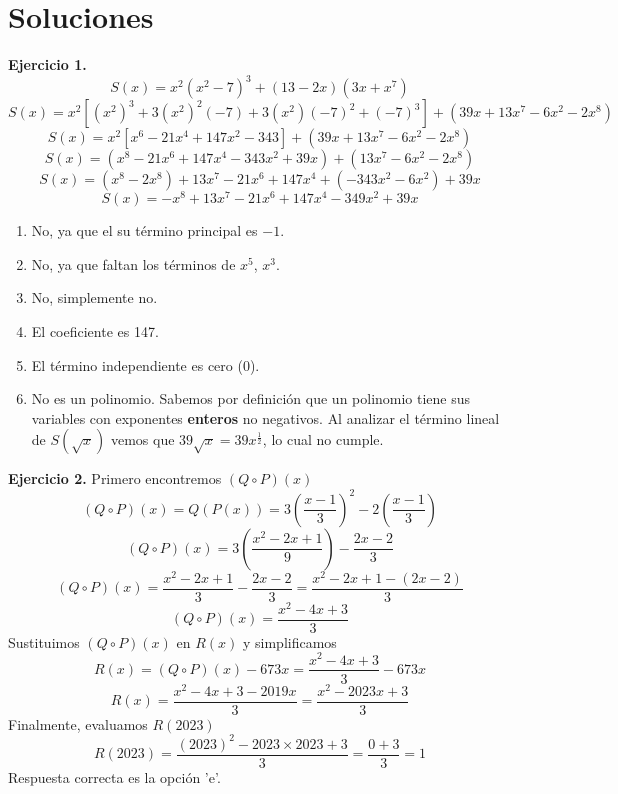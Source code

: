 \newpage

\section*{\large Soluciones}
{
    \textbf{Ejercicio 1.}
    \[S(x) = x^2(x^2 - 7)^3 + (13 - 2x)(3x + x^7)\]
    \[S(x) = x^2 \left[ (x^2)^3 + 3 (x^2)^2(-7) + 3 (x^2)(-7)^2 + (-7)^3 \right] + (39x + 13x^7 - 6x^2 - 2x^8)\]
    \[S(x) = x^2 \left[ x^6 - 21x^4 + 147 x^2 - 343 \right] + (39x + 13x^7 - 6x^2 - 2x^8)\]
    \[S(x) = (x^8 - 21x^6 + 147 x^4 - 343x^2 + 39x) + (13x^7 - 6x^2 - 2x^8)\]
    \[S(x) = (x^8 - 2x^8) + 13x^7 - 21x^6 + 147 x^4 + (- 343x^2 - 6x^2) + 39x\]
    \[S(x) = -x^8 + 13x^7 - 21x^6 + 147 x^4 - 349x^2 + 39x\]

        \begin{enumerate}
            \item No, ya que el su término principal es $-1$.
            \item No, ya que faltan los términos de $x^5$, $x^3$.
            \item No, simplemente no.
            \item El coeficiente es 147.
            \item El término independiente es cero (0).
            \item No es un polinomio. Sabemos por definición que un polinomio tiene sus variables con exponentes \textbf{enteros} no negativos. Al analizar el término lineal de $S(\sqrt {x})$ vemos que $39\sqrt {x} = 39 x^{\frac{1}{2}}$, lo cual no cumple.
        \end{enumerate}

    \textbf{Ejercicio 2.} Primero encontremos $(Q \circ P)(x)$
    \[ (Q \circ P)(x) = Q(P(x)) = 3\left( \frac{x - 1}{3} \right)^2 - 2\left( \frac{x - 1}{3} \right)\]
    \[ (Q \circ P)(x) = 3\left( \frac{x^2 - 2x + 1}{9} \right) - \frac{2x - 2}{3}\]
    \[ (Q \circ P)(x) = \frac{x^2 - 2x + 1}{3} - \frac{2x - 2}{3} = \frac{x^2 - 2x + 1 - (2x - 2)}{3}\]
    \[ (Q \circ P)(x) = \frac{x^2 - 4x + 3}{3}\]
    Sustituimos $(Q \circ P)(x)$ en $R(x)$ y simplificamos
    \[R(x) = (Q \circ P)(x) - 673x = \frac{x^2 - 4x + 3}{3} - 673x\]
    \[R(x) = \frac{x^2 - 4x + 3 - 2019x}{3} = \frac{x^2 - 2023x + 3}{3}\]
    Finalmente, evaluamos $R(2023)$
    \[R(2023) = \frac{(2023)^2 - 2023\times 2023 + 3}{3} = \frac{0 + 3}{3} = 1\]
    Respuesta correcta es la opción 'e'.
}\label{sec:soluciones}